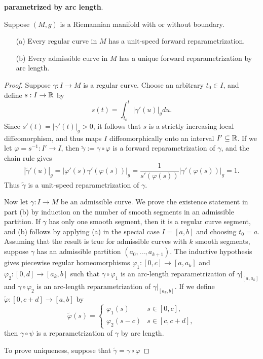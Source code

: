 \textbf{parametrized by arc length}.
\begin{proposition}
Suppose $(M,g)$ is a Riemannian manifold with or without boundary.
\begin{itemize}
\item[(a)] Every regular curve in $M$ has a unit-speed forward 
reparametrization.
\item[(b)] Every admissible curve in $M$ has a unique forward 
reparametrization by arc length.
\end{itemize}
\end{proposition}
\begin{proof}
Suppose $\gamma:I\to M$ is a regular curve. Choose an arbitrary $t_0\in I$, 
and define $s:I\to\mathbb{R}$ by
\[s(t)=\int_{t_0}^{t}|\gamma'(u)|_gdu.\]
Since $s'(t)=|\gamma'(t)|_g>0$, it follows that $s$ is a strictly increasing 
local diffeomorphism, and thus maps $I$ diffeomorphically onto an interval $I'\subseteq\mathbb{R}$. 
If we let $\varphi=s^{-1}:I'\to I$, then $\widetilde{\gamma}:=\gamma\circ\varphi$ 
is a forward reparametrization of $\gamma$, and the chain rule gives
\[|\widetilde{\gamma}'(u)|_g=|\varphi'(s)\gamma'(\varphi(s))|_g=\frac{1}{s'(\varphi(s))}|\gamma'(\varphi(s))|_g=1.\]
Thus $\widetilde{\gamma}$ is a unit-speed reparametrization of $\gamma$.\par
Now let $\gamma:I\to M$ be an admissible curve. We prove the existence 
statement in part (b) by induction on the number of smooth segments in 
an admissible partition. If $\gamma$ has only one smooth segment, then it 
is a regular curve segment, and (b) follows by applying (a) in the 
special case $I=[a,b]$ and choosing $t_0=a$. Assuming that the result is 
true for admissible curves with $k$ smooth segments, suppose $\gamma$ has 
an admissible partition $(a_0,\dots,a_{k+1})$. The inductive hypothesis 
gives piecewise regular homeomorphisms $\varphi_1:[0,c]\to[a,a_k]$ and 
$\varphi_2:[0,d]\to[a_k,b]$ such that $\gamma\circ\varphi_1$ is an arc-length 
reparametrization of $\gamma|_{[a,a_k]}$ and $\gamma\circ\varphi_2$ is an 
arc-length reparametrization of $\gamma|_{[a_k,b]}$. If we define 
$\widetilde{\varphi}:[0,c+d]\to[a,b]$ by
\[\widetilde{\varphi}(s)=\begin{cases}
\varphi_1(s)&s\in[0,c],\\
\varphi_2(s-c)&s\in[c,c+d],
\end{cases}\]
then $\gamma\circ\psi$ is a reparametrization of $\gamma$ by arc length.\par
To prove uniqueness, suppose that $\widetilde{\gamma}=\gamma\circ\varphi$ 

\end{proof}
